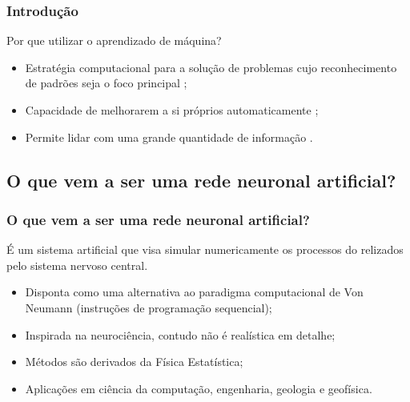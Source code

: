 \documentclass[10pt]{beamer} %
\begin{document}
\begin{frame}
	\frametitle{Introdução}
	\transboxin%
	\begin{block}{Por que utilizar o aprendizado de máquina?}
		\begin{itemize}
			\pause
			\item Estratégia computacional para a solução de problemas cujo reconhecimento de padrões seja o foco principal \citep{MacKay2005};
			\pause
			\item Capacidade de melhorarem a si próprios automaticamente \citep{Michie1994,Levy1997};
			\pause
			\item Permite lidar com uma grande quantidade de informação \citep{Mao1996,Hall2014}.
		\end{itemize}	
	\end{block}
	
\end{frame}
\subsection{O que vem a ser uma rede neuronal artificial?}
\begin{frame}
	\frametitle{O que vem a ser uma rede neuronal artificial?}
				\pause
				\color{blue} É um sistema artificial que visa simular numericamente os processos do relizados pelo sistema nervoso central. 
				\pause
				\begin{itemize}
					\item Disponta como uma alternativa ao paradigma computacional de Von Neumann (instruções de programação sequencial);
					\pause
					\item Inspirada na neurociência, contudo não é realística em detalhe;
					\pause
					\item Métodos são derivados da Física Estatística;
					\pause
					\item Aplicações em ciência da computação, engenharia, geologia e geofísica. 
				\end{itemize}
\end{frame}
\end{document}
